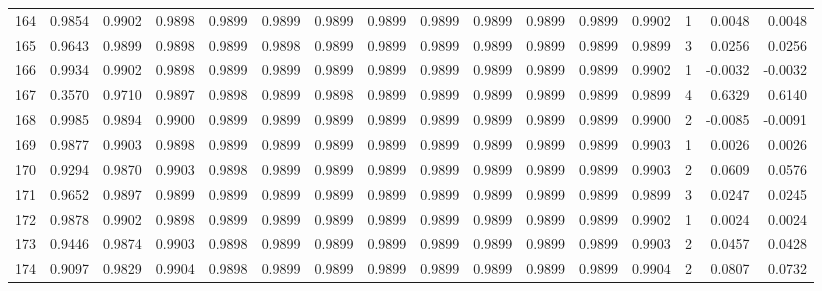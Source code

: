 \begin{tabular}{lrrrrrrrrrrrrrrr}
164 &      0.9854 &  0.9902 &  0.9898 &  0.9899 &  0.9899 &  0.9899 &  0.9899 &  0.9899 &  0.9899 &  0.9899 &   0.9899 &     0.9902 &      1 &                    0.0048 &                     0.0048 \\
165 &      0.9643 &  0.9899 &  0.9898 &  0.9899 &  0.9898 &  0.9899 &  0.9899 &  0.9899 &  0.9899 &  0.9899 &   0.9899 &     0.9899 &      3 &                    0.0256 &                     0.0256 \\
166 &      0.9934 &  0.9902 &  0.9898 &  0.9899 &  0.9899 &  0.9899 &  0.9899 &  0.9899 &  0.9899 &  0.9899 &   0.9899 &     0.9902 &      1 &                   -0.0032 &                    -0.0032 \\
167 &      0.3570 &  0.9710 &  0.9897 &  0.9898 &  0.9899 &  0.9898 &  0.9899 &  0.9899 &  0.9899 &  0.9899 &   0.9899 &     0.9899 &      4 &                    0.6329 &                     0.6140 \\
168 &      0.9985 &  0.9894 &  0.9900 &  0.9899 &  0.9899 &  0.9899 &  0.9899 &  0.9899 &  0.9899 &  0.9899 &   0.9899 &     0.9900 &      2 &                   -0.0085 &                    -0.0091 \\
169 &      0.9877 &  0.9903 &  0.9898 &  0.9899 &  0.9899 &  0.9899 &  0.9899 &  0.9899 &  0.9899 &  0.9899 &   0.9899 &     0.9903 &      1 &                    0.0026 &                     0.0026 \\
170 &      0.9294 &  0.9870 &  0.9903 &  0.9898 &  0.9899 &  0.9899 &  0.9899 &  0.9899 &  0.9899 &  0.9899 &   0.9899 &     0.9903 &      2 &                    0.0609 &                     0.0576 \\
171 &      0.9652 &  0.9897 &  0.9899 &  0.9899 &  0.9899 &  0.9899 &  0.9899 &  0.9899 &  0.9899 &  0.9899 &   0.9899 &     0.9899 &      3 &                    0.0247 &                     0.0245 \\
172 &      0.9878 &  0.9902 &  0.9898 &  0.9899 &  0.9899 &  0.9899 &  0.9899 &  0.9899 &  0.9899 &  0.9899 &   0.9899 &     0.9902 &      1 &                    0.0024 &                     0.0024 \\
173 &      0.9446 &  0.9874 &  0.9903 &  0.9898 &  0.9899 &  0.9899 &  0.9899 &  0.9899 &  0.9899 &  0.9899 &   0.9899 &     0.9903 &      2 &                    0.0457 &                     0.0428 \\
174 &      0.9097 &  0.9829 &  0.9904 &  0.9898 &  0.9899 &  0.9899 &  0.9899 &  0.9899 &  0.9899 &  0.9899 &   0.9899 &     0.9904 &      2 &                    0.0807 &                     0.0732 \\

\end{tabular}
